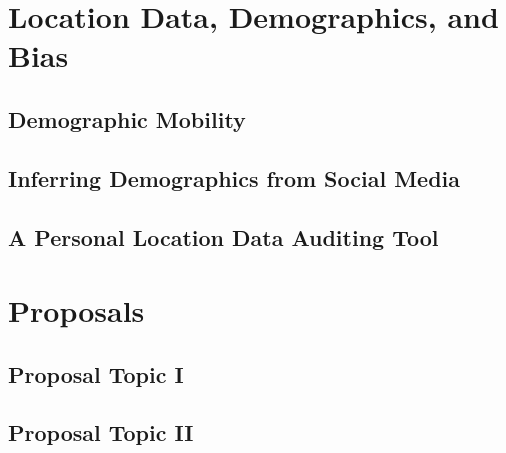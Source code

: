 \documentclass[12pt]{report}
\begin{document}
\chapter{Location Data, Demographics, and Bias}
\label{chap:bias}
  \section{Demographic Mobility}
  \label{sec:bias}
  

  \section{Inferring Demographics from Social Media}
  \label{sec:demo}
  

  \section{A Personal Location Data Auditing Tool}
  \label{sec:findyou}
  

\chapter{Proposals}
\label{chap:proposal}

\section{Proposal Topic I}
\label{sec:proposal-i}



\section{Proposal Topic II}
\label{sec:proposal-ii}



% 


\pagebreak

\begin{footnotesize}

% 

\end{footnotesize}
\end{document}
